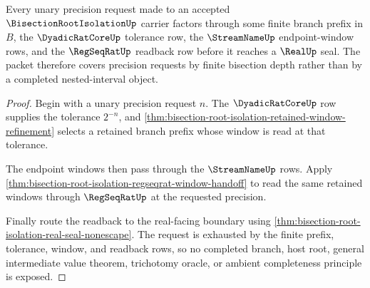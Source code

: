 \begin{theorem}
\label{thm:bisection-root-isolation-depth-coverage}
Every unary precision request made to an accepted $\BisectionRootIsolationUp$ carrier factors through some finite branch prefix in $B$, the $\DyadicRatCoreUp$ tolerance row, the $\StreamNameUp$ endpoint-window rows, and the $\RegSeqRatUp$ readback row before it reaches a $\RealUp$ seal. The packet therefore covers precision requests by finite bisection depth rather than by a completed nested-interval object.
\end{theorem}
\begin{proof}
Begin with a unary precision request $n$. The $\DyadicRatCoreUp$ row supplies the tolerance $2^{-n}$, and \autoref{thm:bisection-root-isolation-retained-window-refinement} selects a retained branch prefix whose window is read at that tolerance.

The endpoint windows then pass through the $\StreamNameUp$ rows. Apply \autoref{thm:bisection-root-isolation-regseqrat-window-handoff} to read the same retained windows through $\RegSeqRatUp$ at the requested precision.

Finally route the readback to the real-facing boundary using \autoref{thm:bisection-root-isolation-real-seal-nonescape}. The request is exhausted by the finite prefix, tolerance, window, and readback rows, so no completed branch, host root, general intermediate value theorem, trichotomy oracle, or ambient completeness principle is exposed.
\end{proof}

